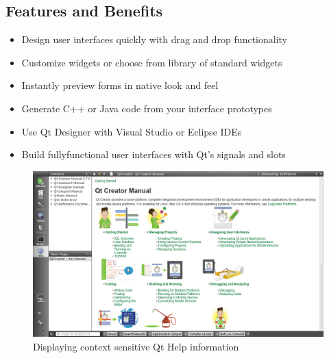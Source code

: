 


\subsection{Features and Benefits}
\begin{itemize}
\item Design user interfaces quickly with drag and drop functionality
\item Customize widgets or choose from library of standard widgets
\item Instantly preview forms in native look and feel
\item Generate C++ or Java code from your interface prototypes
\item Use Qt Designer with Visual Studio or Eclipse IDEs
\item Build fully­functional user interfaces with Qt’s signals and slots
\end{itemize}
\begin{figure}[htb]
\begin{center}
\includegraphics[scale=0.4]{images/Qtman.png}
\caption{ Displaying context sensitive Qt Help information}
\end{center}
\end{figure}